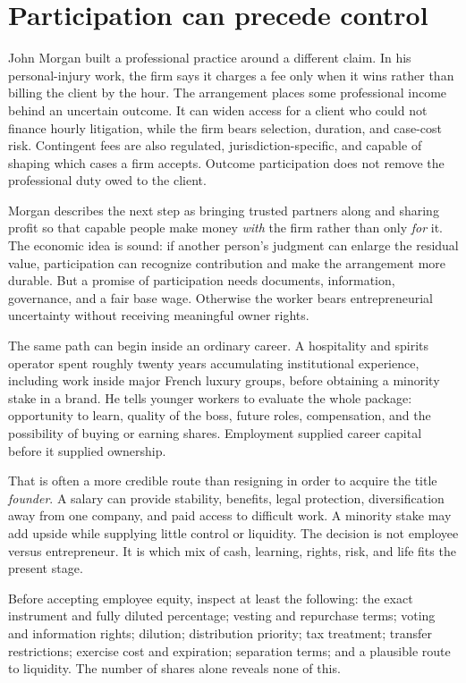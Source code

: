 \section{Participation can precede control}

John Morgan built a professional practice around a different claim. In his
personal-injury work, the firm says it charges a fee only when it wins rather
than billing the client by the hour. The arrangement places some professional
income behind an uncertain outcome. It can widen access for a client who could
not finance hourly litigation, while the firm bears selection, duration, and
case-cost risk. Contingent fees are also regulated, jurisdiction-specific, and
capable of shaping which cases a firm accepts. Outcome participation does not
remove the professional duty owed to the client.

Morgan describes the next step as bringing trusted partners along and sharing
profit so that capable people make money \emph{with} the firm rather than only
\emph{for} it. The economic idea is sound: if another person's judgment can
enlarge the residual value, participation can recognize contribution and make
the arrangement more durable. But a promise of participation needs documents,
information, governance, and a fair base wage. Otherwise the worker bears
entrepreneurial uncertainty without receiving meaningful owner rights.

The same path can begin inside an ordinary career. A hospitality and spirits
operator spent roughly twenty years accumulating institutional experience,
including work inside major French luxury groups, before obtaining a minority
stake in a brand. He tells younger workers to evaluate the whole package:
opportunity to learn, quality of the boss, future roles, compensation, and the
possibility of buying or earning shares. Employment supplied career capital
before it supplied ownership.

That is often a more credible route than resigning in order to acquire the
title \emph{founder}. A salary can provide stability, benefits, legal
protection, diversification away from one company, and paid access to difficult
work. A minority stake may add upside while supplying little control or
liquidity. The decision is not employee versus entrepreneur. It is which mix of
cash, learning, rights, risk, and life fits the present stage.

Before accepting employee equity, inspect at least the following: the exact
instrument and fully diluted percentage; vesting and repurchase terms; voting
and information rights; dilution; distribution priority; tax treatment;
transfer restrictions; exercise cost and expiration; separation terms; and a
plausible route to liquidity. The number of shares alone reveals none of this.

